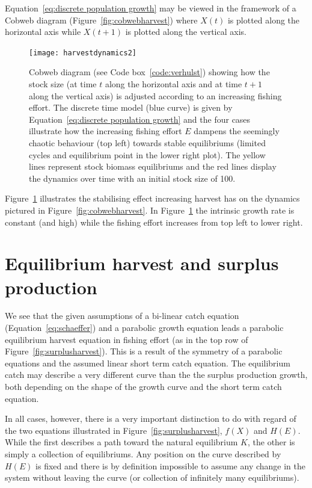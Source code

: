 \documentclass[11pt,fleqn]{book} %
\begin{document}
Equation~\ref{eq:discrete population growth} may be viewed in the framework of a Cobweb diagram (Figure~\ref{fig:cobwebharvest}) where $X(t)$ is plotted along the horizontal axis while $X(t+1)$ is plotted along the vertical axis.
\begin{figure}[ht]
\centering\texttt{[image: harvestdynamics2]} 
\caption{Cobweb diagram (see Code box~\ref{code:verhulst}) showing how the stock size (at time $t$ along the horizontal axis and at time $t+1$ along the vertical axis) is adjusted according to an increasing fishing effort. The discrete time model (blue curve) is given by Equation~\ref{eq:discrete population growth} and the four cases illustrate how the increasing fishing effort $E$ dampens the seemingly chaotic behaviour (top left) towards stable equilibriums (limited cycles and equilibrium point in the lower right plot). The yellow lines represent stock biomass equilibriums and the red lines display the dynamics over time with an initial stock size of 100.\\}
\label{fig:cobwebharvest2}
\end{figure}
\hfill \break
Figure~\ref{fig:cobwebharvest2} illustrates the stabilising effect increasing harvest has on the dynamics pictured in Figure~\ref{fig:cobwebharvest}. In Figure~\ref{fig:cobwebharvest2} the intrinsic growth rate is constant (and high) while the fishing effort increases from top left to lower right.

\section{Equilibrium harvest and surplus production}\label{harvestsurplus}
We see that the given assumptions of a bi-linear catch equation (Equation~\ref{eq:schaeffer}) and a parabolic growth equation leads a parabolic equilibrium harvest equation in fishing effort (as in the top row of Figure~\ref{fig:surplusharvest}). This is a result of the symmetry of a parabolic equations and the assumed linear short term catch equation. The equilibrium catch may describe a very different curve than the the surplus production growth, both depending on the shape of the growth curve and the short term catch equation. 

In all cases, however, there is a very important distinction to do with regard of the two equations illustrated in Figure~\ref{fig:surplusharvest}, $f(X)$ and $H(E)$. While the first describes a path toward the natural equilibrium $K$, the other is simply a collection of equilibriums. Any position on the curve described by $H(E)$ is fixed and there is by definition impossible to assume any change in the system without leaving the curve (or collection of infinitely many equilibriums).
\end{document}

